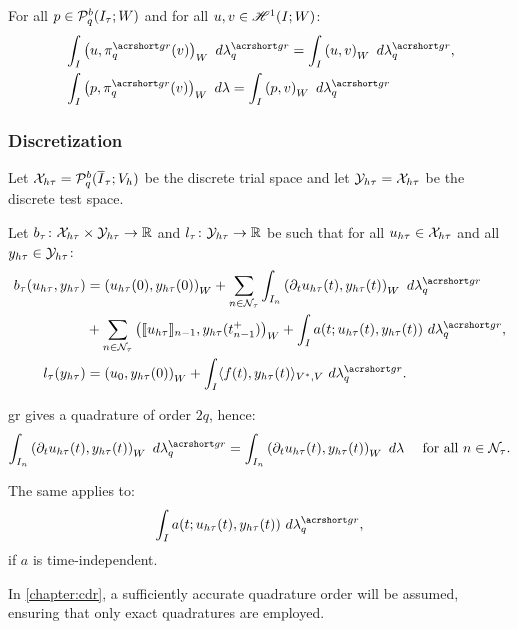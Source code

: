 \begin{proposition}
    For all $p \in \mathcal{P}_{q}^b(I_{\tau}; W)$ and for all $u, v \in \mathscr{H}^{1}(I; W)$:
    \begin{align}
        & \int_I \left( u, \InterpolantGR_q(v) \right)_W ~ d \lambdaGR_q = \int_I \left( u, v \right)_W ~ d \lambdaGR_q, \\
        & \int_I \left( p, \InterpolantGR_q(v) \right)_W ~ d \lambda = \int_I \left( p, v \right)_W ~ d \lambdaGR_q
    \end{align}
\end{proposition}

\subsubsection{Discretization}

\begin{definition}
    Let $\mathcal{X}_{h \tau} = \mathcal{P}_{q}^b(\overline{I}_{\tau}; V_h)$ be the discrete trial space and let $\mathcal{Y}_{h \tau} = \mathcal{X}_{h \tau}$ be the discrete test space.
\end{definition}

\begin{definition}
    Let $b_{\tau} \colon \mathcal{X}_{h \tau} \times \mathcal{Y}_{h \tau} \rightarrow \mathbb{R}$ and $l_{\tau} \colon \mathcal{Y}_{h \tau} \rightarrow \mathbb{R}$ be such that for all $u_{h \tau} \in \mathcal{X}_{h \tau}$ and all $y_{h \tau} \in \mathcal{Y}_{h \tau}$:
    \begin{align}
        b_{\tau}(u_{h \tau}, y_{h \tau}) & = \left( u_{h \tau}(0), y_{h \tau}(0) \right)_W + \sum_{n \in \TimeIndices} \int_{I_n} \left( \partial_t u_{h \tau}(t), y_{h \tau}(t) \right)_W ~ d \lambdaGR_q \\
        & + \sum_{n \in \TimeIndices} \left( \llbracket u_{h \tau} \rrbracket_{n - 1}, y_{h \tau}(t_{n - 1}^+) \right)_W + \int_I a(t; u_{h \tau}(t), y_{h \tau}(t)) ~ d \lambdaGR_q, \notag \\
        l_{\tau}(y_{h \tau}) & = \left( u_0, y_{h \tau}(0) \right)_W + \int_I \langle f(t), y_{h \tau}(t) \rangle_{V^*, V} ~ d \lambdaGR_q.
    \end{align}
\end{definition}

\begin{remark}
    \acrshort{gr} gives a quadrature of order $2q$, hence:
    \begin{align}
        \int_{I_n} \left( \partial_t u_{h \tau}(t), y_{h \tau}(t) \right)_W ~ d \lambdaGR_q &= \int_{I_n} \left( \partial_t u_{h \tau}(t), y_{h \tau}(t) \right)_W ~ d \lambda &\text{ for all } n \in \TimeIndices.
    \end{align}
    
    The same applies to:
    \begin{align}
        \int_I a(t; u_{h \tau}(t), y_{h \tau}(t)) ~ d \lambdaGR_q,
    \end{align}
    if $a$ is time-independent.
\end{remark}
In \cref{chapter:cdr}, a sufficiently accurate quadrature order will be assumed, ensuring that only exact quadratures are employed.

